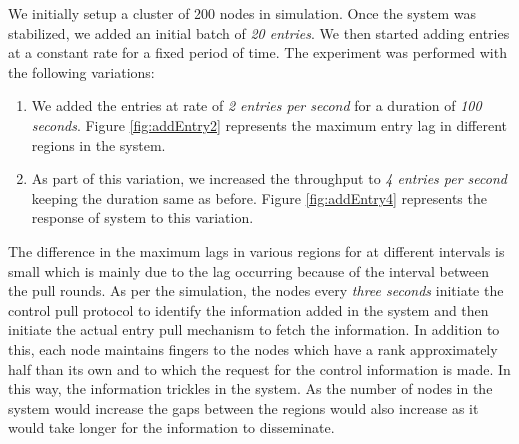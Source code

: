 \documentclass[a4paper,11pt]{kth-mag}
\begin{document}
\par We initially setup a cluster of 200 nodes in simulation. Once the system was stabilized, we added an initial batch of \textit{20 entries}. We then started adding entries at a constant rate for a fixed period of time. The experiment was performed  with the following variations:


\begin{enumerate}

\item We added the entries at rate of \textit{2 entries per second} for a duration of  \textit{100 seconds}. Figure \ref{fig:addEntry2} represents the maximum entry lag in different regions in the system.

\item As part of this variation, we increased the throughput to \textit{4 entries per second} keeping the duration same as before. Figure \ref{fig:addEntry4} represents the response of system to this variation.

\end{enumerate}


The difference in the maximum lags in various regions for at different intervals is small which is mainly due to the lag occurring because of the interval between the pull rounds. As per the simulation, the nodes every \textit{three seconds} initiate the control pull protocol to identify the information added in the system and then initiate the actual entry pull mechanism to fetch the information. In addition to this, each node maintains fingers to the nodes which have a rank approximately half than its own and to which the request for the control information is made. In this way, the information trickles in the system. As the number of nodes in the system would increase the gaps between the regions would also increase as it would take longer for the information to disseminate. 
\end{document}
